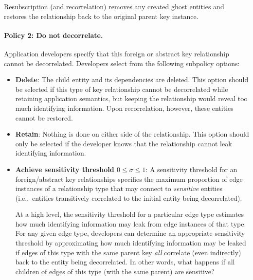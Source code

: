 Resubscription (and recorrelation) removes any created ghost entities and restores the relationship
back to the original parent key instance.

%
\paragraph{Policy 2: Do not decorrelate.}
Application developers specify that this foreign or abstract key relationship cannot be decorrelated.
Developers select from the following subpolicy options: 
\begin{itemize}
    \item \textbf{Delete}: The child entity and its dependencies are deleted. This option should be
        selected if this type of key relationship cannot be decorrelated while retaining application
        semantics, but keeping the relationship would reveal too much identifying information.
        Upon recorrelation, however, these entities cannot be restored.

    \item \textbf{Retain}: Nothing is done on either side of the
        relationship. This option should only be selected if the developer knows that the
        relationship cannot leak identifying information.

    \item \textbf{Achieve sensitivity threshold $0 \le \sigma \le 1$}:
        A sensitivity threshold for an foreign/abstract key relationships specifies the maximum
        proportion of edge instances of a relationship type that may connect to \emph{sensitive}
        entities (i.e.,\ entities transitively correlated to the initial entity being decorrelated). 

        At a high level, the sensitivity threshold for a particular edge type estimates how much identifying
        information may leak from edge instances of that type.  For any given edge type, developers can
        determine an appropriate sensitivity threshold by approximating how much identifying information
        may be leaked if edges of this type with the same parent key \emph{all} correlate (even indirectly)
        back to the entity being decorrelated. In other words, what happens if all children of edges of this
        type (with the same parent) are sensitive?


\end{itemize}
